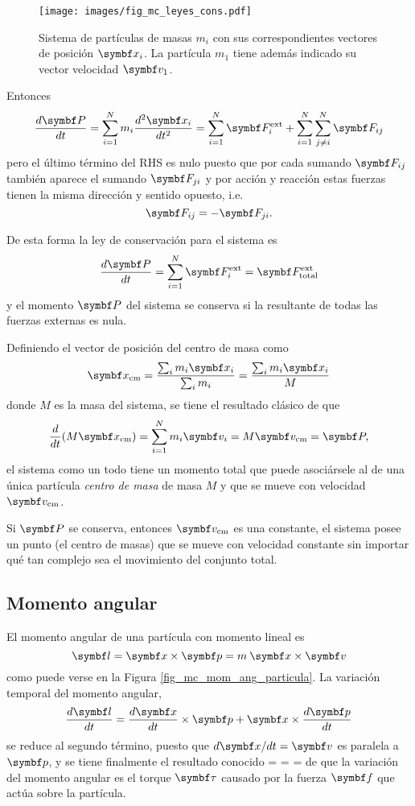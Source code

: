 \documentclass[10pt,oneside]{CBFT_book}
\begin{document}
\begin{figure}[hbt]
	\begin{center}
	\texttt{[image: images/fig\_mc\_leyes\_cons.pdf]}
	\end{center}
	\caption{Sistema de partículas de masas $m_i$ con sus correspondientes vectores de
	posición $\vb{x}_i$. La partícula $m_1$ tiene además indicado su vector velocidad $\vb{v}_1$.}
	\label{fig_mc_leyes_cons}
\end{figure} 

Entonces 
\[
	\dtot{\vb{P}}{t} = \Sum{i=1}{N} m_i \dtot[2]{\vb{x}_i}{t} = \Sum{i=1}{N} \vb{F}_i^\text{ext} + 
	\Sum{i=1}{N} \Sum{ j \neq i }{N} \vb{F}_{ij}
\]
pero el último término del RHS es nulo puesto que por cada sumando $ \vb{F}_{ij} $ también aparece el sumando 
$ \vb{F}_{ji} $ y por acción y reacción estas fuerzas tienen la misma dirección y sentido opuesto, i.e.
\[
	\vb{F}_{ij} = - \vb{F}_{ji}.
\]

De esta forma la ley de conservación para el sistema es 
\[
	\dtot{\vb{P}}{t} = \Sum{i=1}{N} \vb{F}_i^\text{ext} = \vb{F}^\text{ext}_\text{total}
\]
y el momento $ \vb{P} $ del sistema se conserva si la resultante de todas las fuerzas externas es nula. 

Definiendo el vector de posición del centro de masa como 
\[
	\vb{x}_\text{cm} = \frac{\sum_i m_i \vb{x}_i }{\sum_i m_i} = \frac{\sum_i m_i \vb{x}_i }{M}
\]
donde $ M $ es la masa del sistema, se tiene el resultado clásico de que
\[
	\dtot{}{t}( M \vb{x}_\text{cm} ) = \Sum{i=1}{N} m_i \vb{v}_i = M \vb{v}_\text{cm} = \vb{P},
\]
el sistema como un todo tiene un momento total que puede asociársele al de una única partícula {\it centro de masa} de 
masa $M$ y que se mueve con velocidad $ \vb{v}_\text{cm} $.

Si $\vb{P}$ se conserva, entonces $ \vb{v}_\text{cm} $ es una constante, el sistema posee un punto (el centro de masas) 
que se mueve con velocidad constante sin importar qué tan complejo sea el movimiento del conjunto total.

\subsection{Momento angular}

El momento angular de una partícula con momento lineal  es 
\[
	\vb{l} = \vb{x} \times \vb{p} = m \: \vb{x} \times \vb{v}
\]
como puede verse en la Figura \ref{fig_mc_mom_ang_particula}. 
La variación temporal del momento angular,
\[
	\dtot{\vb{l}}{t} = \dtot{\vb{x}}{t} \times \vb{p} + \vb{x} \times \dtot{\vb{p}}{t} 
\]
se reduce al segundo término, puesto que $ d\vb{x}/dt = \vb{v} $ es paralela a $ \vb{p} $, y
se tiene finalmente el resultado conocido
\be
	 =  \times {} =  \times {} = \vb{\tau}
	\label{conserv_mom_ang}
\ee
de que la variación del momento angular es el torque $\vb{\tau}$ causado por la fuerza $ \vb{f} $ 
que actúa sobre la partícula.
\end{document}
